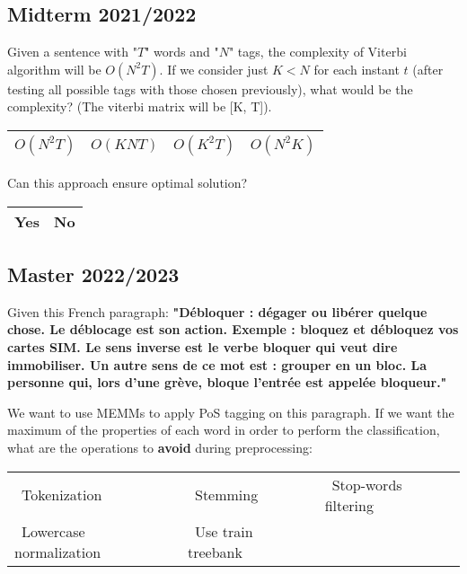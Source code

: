 \documentclass[11pt, a4paper]{article}
\begin{document}
\subsection{Midterm 2021/2022}

Given a sentence with "$ T $" words and "$ N $" tags, the complexity of Viterbi algorithm will be $ O(N^2T) $.
If we consider just $ K < N $ for each instant $ t $ (after testing all possible tags with those chosen previously), what would be the complexity? (The viterbi matrix will be [K, T]).

\begin{center}
	\begin{tabular}{|llll|}
		\hline
		\Circle $ O(N^2T) $ & \Circle $ O(KNT) $ & \Circle $ O(K^2T) $ & \Circle $ O(N^2K) $ \\
		\hline
	\end{tabular}
\end{center}

Can this approach ensure optimal solution?
\begin{center}
	\begin{tabular}{|ll|}
		\hline
		\Circle Yes & \Circle No \\
		\hline
	\end{tabular}
\end{center}



\subsection{Master 2022/2023}

Given this French paragraph: \textbf{"Débloquer : dégager ou libérer quelque chose. Le déblocage est son action. Exemple : bloquez et débloquez vos cartes SIM. Le sens inverse est le verbe bloquer qui veut dire immobiliser. Un autre sens de ce mot est : grouper en un bloc. La personne qui, lors d’une grève, bloque l’entrée est appelée bloqueur."}

We want to use MEMMs to apply PoS tagging on this paragraph. 
If we want the maximum of the properties of each word in order to perform the classification, what are the operations to \textbf{avoid} during preprocessing:
\begin{center}
	\begin{tabular}{|lll|}
		\hline
		\Square\  Tokenization & \Square\ Stemming & \Square\ Stop-words filtering \\
		\Square\ Lowercase normalization & \Square\ Use train treebank & \\
		\hline
	\end{tabular}
\end{center}
\end{document}
